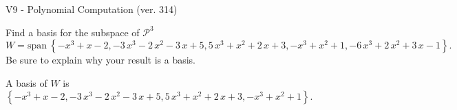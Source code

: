 \begin{exercise}
  \begin{exerciseTitle}V9 - Polynomial Computation (ver. 314)\end{exerciseTitle}
  \begin{exerciseStatement}
    Find a basis for the subspace of \(\mathcal{P}^3\) 
\[W=\mathrm{span}\ \left\{-x^{3} + x - 2 , -3 \, x^{3} - 2 \, x^{2} - 3 \, x + 5 , 5 \, x^{3} + x^{2} + 2 \, x + 3 , -x^{3} + x^{2} + 1 , -6 \, x^{3} + 2 \, x^{2} + 3 \, x - 1\right\}.\]
 Be sure to explain why your result is a basis.


  \end{exerciseStatement}
  \begin{exerciseAnswer}
   A basis of \(W\) is  \(\left\{-x^{3} + x - 2 , -3 \, x^{3} - 2 \, x^{2} - 3 \, x + 5 , 5 \, x^{3} + x^{2} + 2 \, x + 3 , -x^{3} + x^{2} + 1\right\}\).
  


  \end{exerciseAnswer}
\end{exercise}